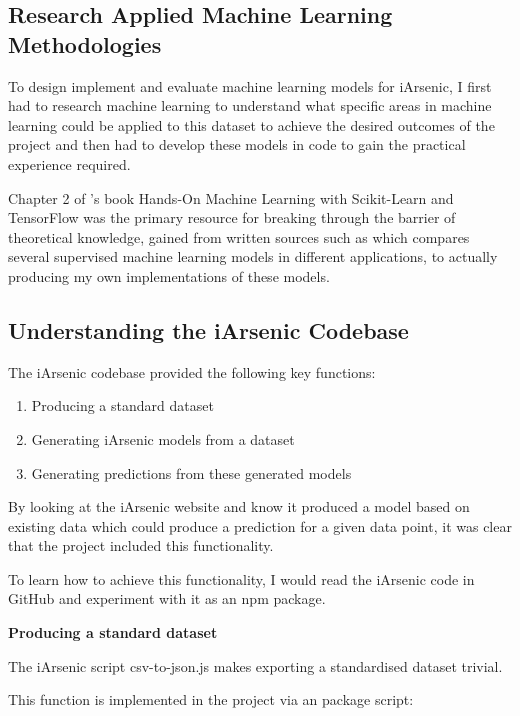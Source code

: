 \subsection{Research Applied Machine Learning Methodologies}

To design implement and evaluate machine learning models for iArsenic, I first had to research machine learning to understand what specific areas in machine learning could be applied to this dataset to achieve the desired outcomes of the project and then had to develop these models in code to gain the practical experience required.

Chapter 2 of \cite{Aurélien2017}'s book Hands-On Machine Learning with Scikit-Learn and TensorFlow was the primary resource for breaking through the barrier of theoretical knowledge, gained from written sources such as \cite{Caruana2006} which compares several supervised machine learning models in different applications, to actually producing my own implementations of these models.

\subsection{Understanding the iArsenic Codebase}

The iArsenic codebase provided the following key functions:

\begin{enumerate}
  \label{ia_functions}
  \item Producing a standard dataset
  \item Generating iArsenic models from a dataset
  \item Generating predictions from these generated models
\end{enumerate}

By looking at the iArsenic website and know it produced a model based on existing data which could produce a prediction for a given data point, it was clear that the project included this functionality.

To learn how to achieve this functionality, I would read the iArsenic code in GitHub and experiment with it as an npm package.

\textbf{Producing a standard dataset}

The iArsenic script csv-to-json.js makes exporting a standardised dataset trivial.

This function is implemented in the project via an package script:

